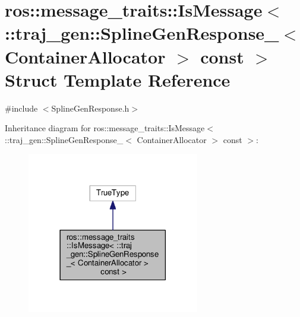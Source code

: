 \hypertarget{structros_1_1message__traits_1_1_is_message_3_01_1_1traj__gen_1_1_spline_gen_response___3_01_con7c3fec9481528da2d39b7d96e0147dbb}{}\section{ros\+:\+:message\+\_\+traits\+:\+:Is\+Message$<$ \+:\+:traj\+\_\+gen\+:\+:Spline\+Gen\+Response\+\_\+$<$ Container\+Allocator $>$ const $>$ Struct Template Reference}
\label{structros_1_1message__traits_1_1_is_message_3_01_1_1traj__gen_1_1_spline_gen_response___3_01_con7c3fec9481528da2d39b7d96e0147dbb}


{\ttfamily \#include $<$Spline\+Gen\+Response.\+h$>$}



Inheritance diagram for ros\+:\+:message\+\_\+traits\+:\+:Is\+Message$<$ \+:\+:traj\+\_\+gen\+:\+:Spline\+Gen\+Response\+\_\+$<$ Container\+Allocator $>$ const $>$\+:
\nopagebreak
\begin{figure}[H]
\begin{center}
\leavevmode
\includegraphics[width=213pt]{structros_1_1message__traits_1_1_is_message_3_01_1_1traj__gen_1_1_spline_gen_response___3_01_cond803f15008f4f0d8b7c6ada2857ab05e}
\end{center}
\end{figure}


